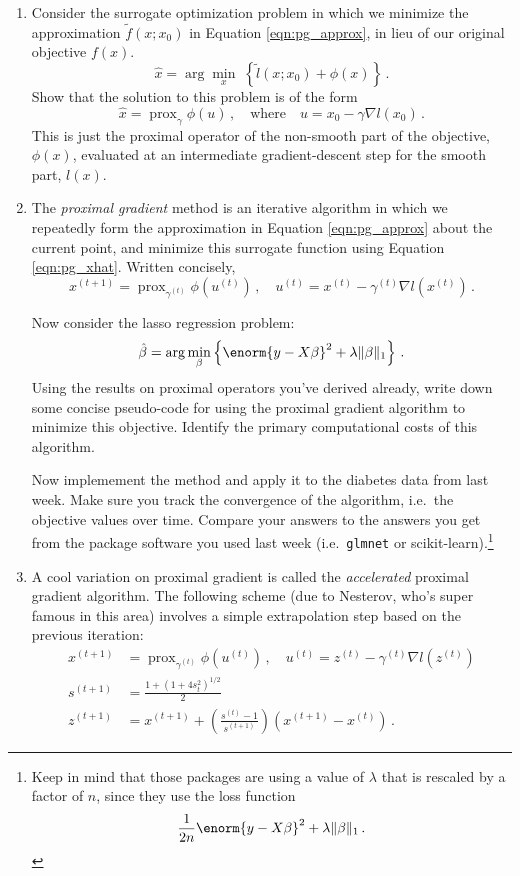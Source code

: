 \documentclass{article}
\DeclareMathOperator*{\prox}{prox}
\begin{document}
\begin{enumerate}[label=(\Alph*)]
\item Consider the surrogate optimization problem in which we minimize the approximation $\tilde{f}(x; x_0)$ in Equation \ref{eqn:pg_approx}, in lieu of our original objective $f(x)$. 
$$
\hat{x} = \arg \min_x \; \left\{   \tilde{l}(x; x_0) + \phi(x)  \right\} \, .
$$
Show that the solution to this problem is of the form
\begin{equation}
\label{eqn:pg_xhat}
\hat{x} = \prox_{\gamma} \phi(u) \, , \quad \mbox{where} \quad u = x_0 - \gamma \nabla l(x_0) \, .
\end{equation}
This is just the proximal operator of the non-smooth part of the objective, $\phi(x)$, evaluated at an intermediate gradient-descent step for the smooth part, $l(x)$.


\item The \textit{proximal gradient} method is an iterative algorithm in which we repeatedly form the approximation in Equation \ref{eqn:pg_approx} about the current point, and minimize this surrogate function using Equation \ref{eqn:pg_xhat}.  Written concisely,
$$
x^{(t+1)} = \prox_{\gamma^{(t)}} \phi(u^{(t)}) \, , \quad u^{(t)} = x^{(t)} - \gamma^{(t)} \nabla l(x^{(t)}) \, .
$$

Now consider the lasso regression problem:
$$
\hat{\beta} = \arg \min_{\beta} \left\{  \enorm{y - X\beta}^2 + \lambda \Vert \beta \Vert_1 \right\} \, .
$$
Using the results on proximal operators you've derived already, write down some concise pseudo-code for using the proximal gradient algorithm to minimize this objective.  Identify the primary computational costs of this algorithm.

Now implemement the method and apply it to the diabetes data from last week.  Make sure you track the convergence of the algorithm, i.e.~the objective values over time.  Compare your answers to the answers you get from the package software you used last week (i.e.~\verb|glmnet| or scikit-learn).\footnote{Keep in mind that those packages are using a value of $\lambda$ that is rescaled by a factor of $n$, since they use the loss function
$$
\frac{1}{2n} \enorm{y - X\beta}^2  + \lambda \Vert \beta \Vert_1 \, .
$$
}

\item A cool variation on proximal gradient is called the \textit{accelerated} proximal gradient algorithm.   The following scheme (due to Nesterov, who's super famous in this area) involves a simple extrapolation step based on the previous iteration:
$$
\begin{aligned}
x^{(t+1)} &= \prox_{ \gamma^{(t)}} \phi(u^{(t)}) \, , \quad u^{(t)} =  z^{(t)} - \gamma^{(t)} \nabla l(z^{(t)})  \\
s^{(t+1)} &= \frac{1 + (1 + 4 s_{t}^2)^{1/2}}{2} \\
z^{(t+1)} &=  x^{(t+1)} + \left( \frac{s^{(t)} - 1}{s^{(t+1)}} \right) (x^{(t+1)} - x^{(t)}) \, .
\end{aligned}
$$




\end{enumerate}
\end{document}
